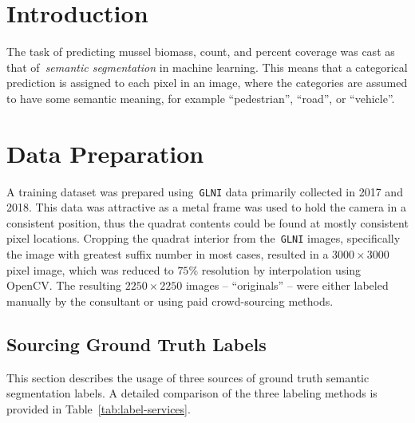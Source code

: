 \documentclass[11pt]{article} %
\begin{document}
\section{Introduction}

The task of predicting mussel biomass, count, and percent coverage was cast as
that of~\emph{semantic segmentation} in machine learning. This means that a 
categorical prediction is assigned to each pixel in an image, where the
categories are assumed to have some semantic meaning, for example 
``pedestrian'', ``road'', or ``vehicle''.

\section{Data Preparation}

A training dataset was prepared using~\texttt{GLNI} data primarily collected in 
2017 and 2018. This data was attractive as a metal frame was used to hold the
camera in a consistent position, thus the quadrat contents could be found at 
mostly consistent pixel locations. Cropping the quadrat interior from 
the~\texttt{GLNI} images, specifically the image with greatest suffix number in
most cases, resulted in a $3000 \times 3000$ pixel image, which was reduced to 
$75\%$ resolution by interpolation using OpenCV. The resulting $2250 \times 
2250$ images -- ``originals'' -- were either labeled manually by the consultant 
or using paid crowd-sourcing methods.

\subsection{Sourcing Ground Truth Labels}

This section describes the usage of three sources of ground truth semantic 
segmentation labels. A detailed comparison of the three labeling methods is 
provided in Table~\ref{tab:label-services}.
\end{document}
